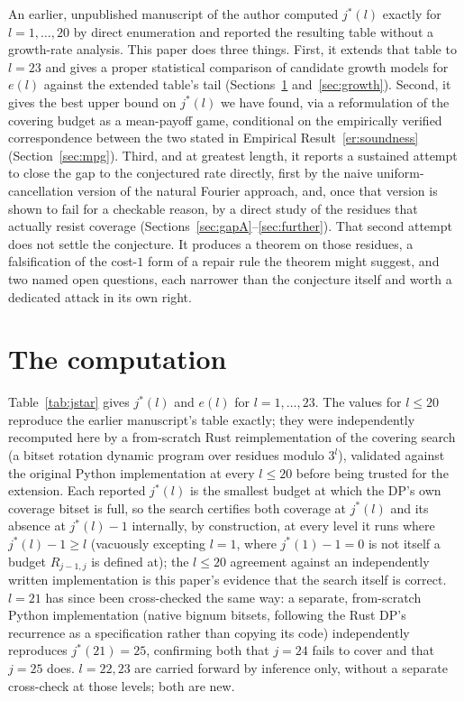 \documentclass[11pt]{amsart}
\theoremstyle{plain}
\theoremstyle{definition}
\theoremstyle{remark}
\begin{document}
An earlier, unpublished manuscript of the author computed $j^*(l)$ exactly for $l=1,\dots,20$ by
direct enumeration and reported the resulting table without a growth-rate analysis. This paper does
three things. First, it extends that table to $l=23$ and gives a proper statistical comparison of
candidate growth models for $e(l)$ against the extended table's tail (Sections~\ref{sec:computation}
and~\ref{sec:growth}). Second, it gives the best upper bound on $j^*(l)$ we have found, via a
reformulation of the covering budget as a mean-payoff game, conditional on the empirically verified
correspondence between the two stated in Empirical Result~\ref{er:soundness}
(Section~\ref{sec:mpg}). Third, and at greatest length, it reports a sustained attempt to close the
gap to the conjectured rate directly, first by the naive uniform-cancellation version of the natural
Fourier approach, and, once that version is shown to fail for a checkable reason, by a direct study
of the residues that actually resist coverage (Sections~\ref{sec:gapA}--\ref{sec:further}). That
second attempt does not settle the conjecture. It produces a theorem on those residues, a
falsification of the cost-$1$ form of a repair rule the theorem might suggest, and two named open
questions, each
narrower than the conjecture itself and worth a dedicated attack in its own right.

\section{The computation}
\label{sec:computation}

Table~\ref{tab:jstar} gives $j^*(l)$ and $e(l)$ for $l=1,\dots,23$. The values for $l\le20$
reproduce the earlier manuscript's table exactly; they were independently recomputed here by a
from-scratch Rust reimplementation of the covering search (a bitset rotation dynamic program over
residues modulo $3^l$), validated against the original Python implementation at every $l\le20$
before being trusted for the extension. Each reported $j^*(l)$ is the smallest budget at which the
DP's own coverage bitset is full, so the search certifies both coverage at $j^*(l)$ and its absence
at $j^*(l)-1$ internally, by construction, at every level it runs where $j^*(l)-1\ge l$ (vacuously
excepting $l=1$, where $j^*(1)-1=0$ is not itself a budget $R_{j-1,j}$ is defined at); the $l\le20$
agreement against an
independently written implementation is this paper's evidence that the search itself is correct.
$l=21$ has since been cross-checked the same way: a separate, from-scratch Python implementation
(native bignum bitsets, following the Rust DP's recurrence as a specification rather than copying
its code) independently reproduces $j^*(21)=25$, confirming both that $j=24$ fails to cover and that
$j=25$ does. $l=22,23$ are carried forward by inference only, without a separate cross-check at
those levels; both are new.
\end{document}
